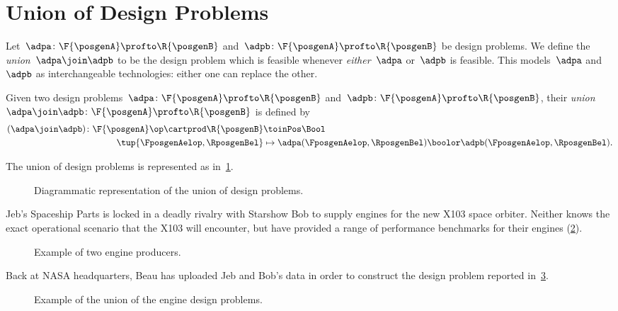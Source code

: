 
\section{Union of Design Problems}

Let~$\adpa\colon \F{\posgenA}\profto \R{\posgenB}$ and~$\adpb\colon \F{\posgenA}\profto \R{\posgenB}$ be design problems.
We define the \emph{union}~$\adpa \join \adpb$ to be the design problem which is feasible whenever \emph{either}~$\adpa$ or~$\adpb$ is feasible.
This models~$\adpa$ and~$\adpb$ as interchangeable technologies: either one can replace the other.

\begin{definition}
	\label{def:union_dp}
	Given two design problems~$\adpa \colon \F{\posgenA} \profto \R{\posgenB}$ and~$\adpb\colon \F{\posgenA} \profto \R{\posgenB}$, their \emph{union}~$\adpa \join \adpb\colon \F{\posgenA} \profto \R{\posgenB}$ is defined by
	\begin{align}
		(\adpa \join \adpb)
		\colon \F{\posgenA}\op \cartprod \R{\posgenB} & \toinPos \Bool         \label{eq:union-dp-eq}                                        \\
		\tup{\FposgenAelop, \RposgenBel}              & \mapsto \adpa(\FposgenAelop, \RposgenBel) \boolor \adpb(\FposgenAelop, \RposgenBel).
	\end{align}
\end{definition}

The union of design problems is represented as in~\cref{fig:uniondp}.

\begin{figure}[h!]
	\centering
	\caption{Diagrammatic representation of the union of design problems. }
	\label{fig:uniondp}
\end{figure}

\begin{example}
	Jeb's Spaceship Parts is locked in a deadly rivalry with Starshow Bob to supply engines for the new X103 space orbiter.
	Neither knows the exact operational scenario that the X103 will encounter, but have provided a range of performance benchmarks for their engines (\cref{fig:exunion_1}).
	\begin{figure}[h!]
		\centering
		\caption{Example of two engine producers. }
		\label{fig:exunion_1}
	\end{figure}
	Back at NASA headquarters, Beau has uploaded Jeb and Bob's data in order to construct the design problem reported in~\cref{fig:exunion_2}.
	\begin{figure}[h!]
		\centering
		\caption{Example of the union of the engine design problems. }
		\label{fig:exunion_2}
	\end{figure}
\end{example}


